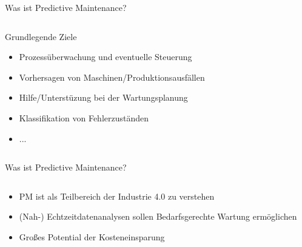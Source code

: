 \documentclass[aspectratio=1610, xcolor=dvipsnames, 9pt]{beamer}
\begin{document}
      \begin{frame}{Was ist Predictive Maintenance?}
      \begin{columns}
        \begin{column}{1\textwidth}
          Grundlegende Ziele
          \begin{itemize}
            \item Prozessüberwachung und eventuelle Steuerung \newline
            \item Vorhersagen von Maschinen/Produktionsausfällen\newline 
            \item Hilfe/Unterstüzung bei der Wartungsplanung \newline 
            \item Klassifikation von Fehlerzuständen \newline 
            \item ...
          \end{itemize}
        \end{column}
      \end{columns}
        \end{frame}
    

        \begin{frame}{Was ist Predictive Maintenance?}
          \begin{columns}
            \begin{column}{1\textwidth}
              \begin{itemize}
                \item PM ist als Teilbereich der Industrie 4.0 zu verstehen \newline
                \item (Nah-) Echtzeitdatenanalysen sollen Bedarfsgerechte Wartung ermöglichen \newline
                \item Großes Potential der Kosteneinsparung \newline
              \end{itemize}
            \end{column}
          \end{columns}
            \end{frame}
\end{document}
